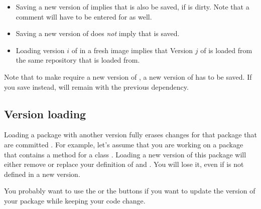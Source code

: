 \documentclass[a4paper,10pt,twoside]{book}
\begin{document}
\begin{itemize}
\item Saving a new version of  implies that  is also be saved, if  is dirty. Note that a comment will have to be entered for  as well.
\item Saving a new version of  does \emph{not} imply that  is saved.
\item Loading version $i$ of  in a fresh image implies that Version $j$ of  is loaded from the same repository that  is loaded from.  
\end{itemize}

Note that to make  require a new version of , a new version of  has to be saved. If you save  instead,  will remain with the previous dependency.


\subsection{Version loading}

Loading a package with another version  fully erases changes for that package that are committed . For example, let's assume that you are working on a package that contains a method  for a class . Loading a new version of this package will either remove or replace  your definition of  and . You will lose it, even if  is not defined in a new version. 

You probably want to use the  or the  buttons if you want to update the version of your package while keeping your code change.
\end{document}
